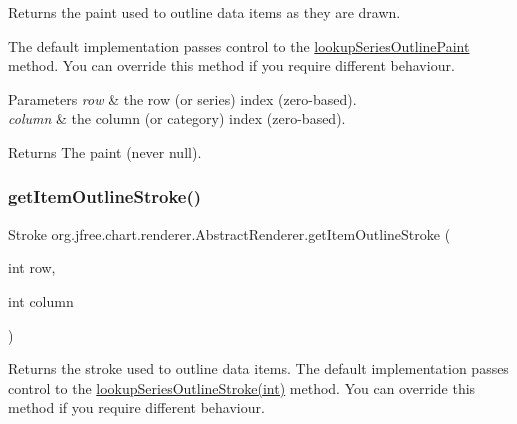 Returns the paint used to outline data items as they are drawn. 

The default implementation passes control to the \mbox{\hyperlink{classorg_1_1jfree_1_1chart_1_1renderer_1_1_abstract_renderer_a1e691b145468f90219f5883f146664f5}{lookup\+Series\+Outline\+Paint}} method. You can override this method if you require different behaviour.


\begin{DoxyParams}{Parameters}
{\em row} & the row (or series) index (zero-\/based). \\
\hline
{\em column} & the column (or category) index (zero-\/based).\\
\hline
\end{DoxyParams}
\begin{DoxyReturn}{Returns}
The paint (never {\ttfamily null}). 
\end{DoxyReturn}
\mbox{\label{classorg_1_1jfree_1_1chart_1_1renderer_1_1_abstract_renderer_ae283acd1318cfbff61d6128ac4649f54}} 
\subsubsection{\texorpdfstring{get\+Item\+Outline\+Stroke()}{getItemOutlineStroke()}}
{\footnotesize\ttfamily Stroke org.\+jfree.\+chart.\+renderer.\+Abstract\+Renderer.\+get\+Item\+Outline\+Stroke (\begin{DoxyParamCaption}\item[{int}]{row,  }\item[{int}]{column }\end{DoxyParamCaption})}

Returns the stroke used to outline data items. The default implementation passes control to the \mbox{\hyperlink{classorg_1_1jfree_1_1chart_1_1renderer_1_1_abstract_renderer_aab0f5b5e5cc74fae532800cd503c3612}{lookup\+Series\+Outline\+Stroke(int)}} method. You can override this method if you require different behaviour.


